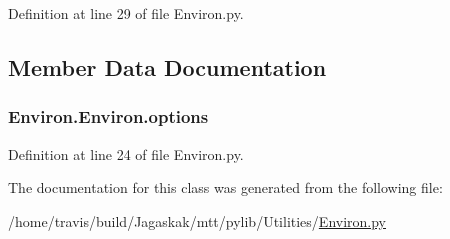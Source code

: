 Definition at line 29 of file Environ.\-py.



\subsection{Member Data Documentation}
\hypertarget{classEnviron_1_1Environ_a9e1a6482623e5f36b1de334c27df5011}{
\subsubsection[{options}]{\setlength{\rightskip}{0pt plus 5cm}Environ.\-Environ.\-options}}\label{classEnviron_1_1Environ_a9e1a6482623e5f36b1de334c27df5011}


Definition at line 24 of file Environ.\-py.



The documentation for this class was generated from the following file\-:\begin{DoxyCompactItemize}
\item 
/home/travis/build/\-Jagaskak/mtt/pylib/\-Utilities/\hyperlink{Environ_8py}{Environ.\-py}\end{DoxyCompactItemize}
